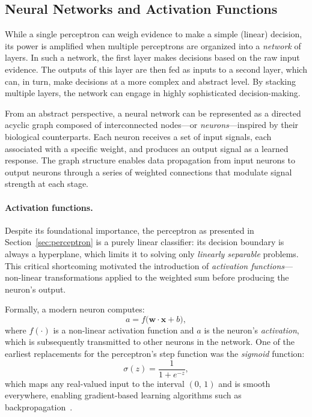 \subsection{Neural Networks and Activation Functions}
\label{sec:neural-networks}

While a single perceptron can weigh evidence to make a simple (linear)
decision, its power is amplified when multiple perceptrons are organized into
a \emph{network} of layers.
In such a network, the first layer makes decisions based on the raw
input evidence.
The outputs of this layer are then fed as inputs to a second layer, which can,
in turn, make decisions at a more complex and abstract level.
By stacking multiple layers, the network can engage in highly sophisticated
decision-making.

From an abstract perspective, a neural network can be represented as a
directed acyclic graph composed of interconnected nodes---or
\emph{neurons}---inspired by their biological counterparts.
Each neuron receives a set of input signals, each associated with a
specific weight, and produces an output signal as a learned response.
The graph structure enables data propagation from input neurons to output
neurons through a series of weighted connections that modulate signal
strength at each stage.

\paragraph{Activation functions.}
Despite its foundational importance, the perceptron as presented in
Section~\ref{sec:perceptron} is a purely linear classifier: its decision
boundary is always a hyperplane, which limits it to solving only
\emph{linearly separable} problems.
This critical shortcoming motivated the introduction of \emph{activation
functions}---non-linear transformations applied to the weighted sum before
producing the neuron's output.

Formally, a modern neuron computes:
\begin{equation}
\label{eq:neuron-activation}
a = f\!\bigl(\mathbf{w} \cdot \mathbf{x} + b\bigr),
\end{equation}
where $f(\cdot)$ is a non-linear activation function and $a$ is the neuron's
\emph{activation}, which is subsequently transmitted to other neurons in the
network. 
One of the earliest replacements for the perceptron's step function was the
\emph{sigmoid} function:
\begin{equation}
\label{eq:sigmoid}
\sigma(z) = \frac{1}{1 + e^{-z}},
\end{equation}
which maps any real-valued input to the interval $(0,\,1)$ and is smooth
everywhere, enabling gradient-based learning algorithms such as
backpropagation~\cite{backprop}.

